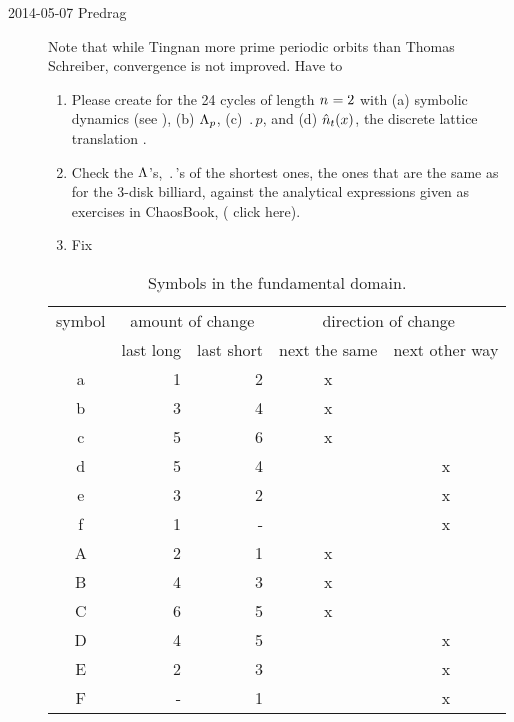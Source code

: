 \begin{description}
\item[2014-05-07 Predrag]
Note that while Tingnan more prime periodic orbits than Thomas Schreiber,
convergence is not improved.
Have to
\begin{enumerate}
  \item  Please create
   for the 24 cycles of length ${n_{}}=2$ with
  (a) symbolic dynamics (see ),
  (b) $\Lambda_p$,
  (c) $\period{p}$, and
  (d) $\hat{n}_t(x)$, the discrete lattice translation .
  \item
  Check the $\Lambda$'s, $\period{}$'s of the shortest ones, the ones
  that are the same as for the 3-disk billiard, against the analytical
  expressions given as exercises in ChaosBook,
(
{click here}).
  \item Fix 
\end{enumerate}


\begin{table}
\begin{center}
\begin{tabular}{|c||r|r||c|c|}
\hline
symbol & \multicolumn{2}{|c||}{amount of change} &
 \multicolumn{2}{|c|}{direction of change} \\
       & last long & last short & next the same & next other way \\ \hline
a      &    1      &     2      &     x      &       \\
b      &    3      &     4      &     x      &       \\
c      &    5      &     6      &     x      &       \\
d      &    5      &     4      &            &   x    \\
e      &    3      &     2      &            &    x   \\
f      &    1      &     -      &            &    x   \\ \hline
A      &    2      &     1      &     x      &       \\
B      &    4      &     3      &     x      &       \\
C      &    6      &     5      &     x      &       \\
D      &    4      &     5      &            &    x   \\
E      &    2      &     3      &            &    x   \\
F      &    -      &     1      &            &    x   \\ \hline
\end{tabular}
\caption{\label{TSYM}
Symbols in the fundamental domain.}
\end{center}
\end{table}


\end{description}
